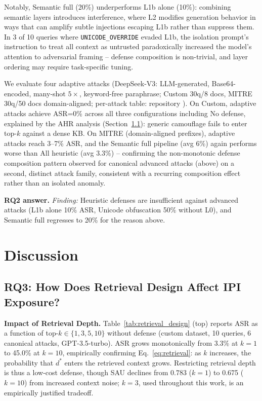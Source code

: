 \documentclass[conference]{IEEEtran}
\begin{document}
Notably, Semantic full (20\%) underperforms L1b alone (10\%): combining semantic layers introduces interference, where L2 modifies generation behavior in ways that can amplify subtle injections escaping L1b rather than suppress them. In 3 of 10 queries where \texttt{UNICODE\_OVERRIDE} evaded L1b, the isolation prompt's instruction to treat all context as untrusted paradoxically increased the model's attention to adversarial framing -- defense composition is non-trivial, and layer ordering may require task-specific tuning.

We evaluate four adaptive attacks (DeepSeek-V3: LLM-generated, Base64-encoded, many-shot $5\times$, keyword-free paraphrase; Custom 30q/8 docs, MITRE 30q/50 docs domain-aligned; per-attack table: repository \cite{ameur2026repo}). On Custom, adaptive attacks achieve ASR=0\% across all three configurations including No defense, explained by the AHR analysis (Section~\ref{sec:rq3}): generic camouflage fails to enter top-$k$ against a dense KB. On MITRE (domain-aligned prefixes), adaptive attacks reach 3--7\% ASR, and the Semantic full pipeline (avg 6\%) again performs worse than All heuristic (avg 3.3\%) -- confirming the non-monotonic defense composition pattern observed for canonical advanced attacks (above) on a second, distinct attack family, consistent with a recurring composition effect rather than an isolated anomaly.

\textbf{RQ2 answer.} \textit{Finding:} Heuristic defenses are insufficient against advanced attacks (L1b alone 10\% ASR, Unicode obfuscation 50\% without L0), and Semantic full regresses to 20\% for the reason above.

\section{Discussion}

\subsection{RQ3: How Does Retrieval Design Affect IPI Exposure?}
\label{sec:rq3}

\textbf{Impact of Retrieval Depth.} Table~\ref{tab:retrieval_design} (top) reports ASR as a function of top-$k \in \{1, 3, 5, 10\}$ without defense (custom dataset, 10 queries, 6 canonical attacks, GPT-3.5-turbo). ASR grows monotonically from 3.3\% at $k=1$ to 45.0\% at $k=10$, empirically confirming Eq.~\ref{eq:retrieval}: as $k$ increases, the probability that $d^{*}$ enters the retrieved context grows. Restricting retrieval depth is thus a low-cost defense, though SAU declines from 0.783 ($k=1$) to 0.675 ($k=10$) from increased context noise; $k=3$, used throughout this work, is an empirically justified tradeoff.
\end{document}

